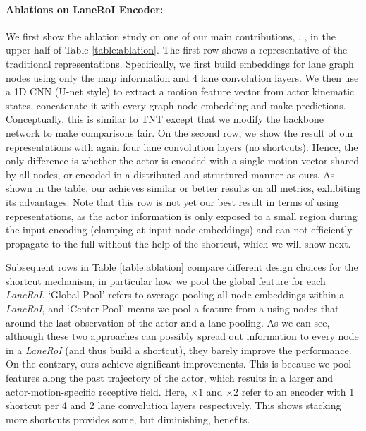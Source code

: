 \paragraph{Ablations on LaneRoI Encoder:}
We first show the ablation study on one of our main contributions, \ie, \ROI, in the upper half of Table
\ref{table:ablation}. 
The first row shows a representative of the traditional representations. 
Specifically, we first build
embeddings for lane graph nodes using only the map information and 4 lane
convolution layers. We then use a
1D CNN (U-net style) to extract a motion feature vector from actor kinematic states, concatenate it
with every graph node embedding and make predictions. Conceptually, this is
similar to TNT \cite{tnt} except that we modify the backbone network to make comparisons fair. 
On the second row, we show the result of our \ROI
representations with again four lane convolution layers (no shortcuts). Hence, the only difference
is whether the actor is encoded with a single motion vector shared by
all nodes, or encoded in a distributed and structured manner as ours. As shown
in the table, our \ROI achieves similar or better results on all
metrics, exhibiting its advantages. Note that this row is not yet our best result
in terms of using \ROI representations, as the actor information is only exposed
to a small region during the input encoding (clamping at input
node embeddings) and can not efficiently propagate to
the full \ROI without the help of the shortcut, which we will show next.

Subsequent rows in Table \ref{table:ablation} compare different design
choices for the shortcut mechanism, in particular how we pool the global feature
for each \textit{LaneRoI}. `Global Pool' refers to average-pooling all node
embeddings within a \textit{LaneRoI}, and `Center Pool' means we pool a feature
from a \ROI using nodes that around the last observation of the actor and a lane
pooling. As we can see, although these two approaches can possibly
spread out information to every node in a \textit{LaneRoI} (and thus build a
shortcut), they barely improve the performance. On the contrary, ours achieve
significant improvements. This is because we pool features along the past
trajectory of the actor, which results in a larger and actor-motion-specific receptive field.
Here, $\times 1$ and $\times 2$ refer to an encoder with 1 shortcut per 4 and 2 lane
convolution layers respectively. This shows stacking more shortcuts
provides some, but diminishing, benefits.









